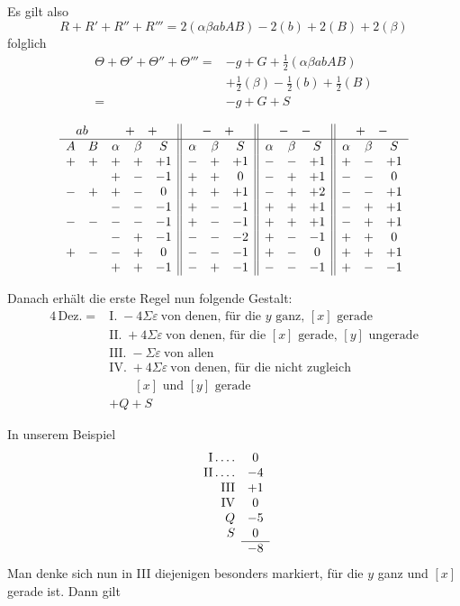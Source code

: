 Es gilt also
\[
R+R'+R''+R'''=2(\alpha\beta abAB)-2(b)+2(B)+2(\beta)
\]
folglich
\[
\begin{aligned}
\Theta+\Theta'+\Theta''+\Theta'''={}&-g+G+\tfrac12(\alpha\beta abAB)\\
&+\tfrac12(\beta)-\tfrac12(b)+\tfrac12(B)\\
={}&-g+G+S
\end{aligned}
\]

\begingroup\small\setlength{\arraycolsep}{2.6pt}
\[
\begin{array}{ccccc||ccc||ccc||ccc}
\multicolumn{2}{c}{ab}&\multicolumn{3}{c||}{+\quad+}&\multicolumn{3}{c||}{-\quad+}&\multicolumn{3}{c||}{-\quad-}&\multicolumn{3}{c}{+\quad-}\\\hline
A&B&\alpha&\beta&S&\alpha&\beta&S&\alpha&\beta&S&\alpha&\beta&S\\
+&+&+&+&+1&-&+&+1&-&-&+1&+&-&+1\\
&&+&-&-1&+&+&0&-&+&+1&-&-&0\\
-&+&+&-&0&+&+&+1&-&+&+2&-&-&+1\\
&&-&-&-1&+&-&-1&+&+&+1&-&+&+1\\
-&-&-&-&-1&+&-&-1&+&+&+1&-&+&+1\\
&&-&+&-1&-&-&-2&+&-&-1&+&+&0\\
+&-&-&+&0&-&-&-1&+&-&0&+&+&+1\\
&&+&+&-1&-&+&-1&-&-&-1&+&-&-1\\
\end{array}
\]
\endgroup

Danach erhält die erste Regel nun folgende Gestalt:
\[
\begin{aligned}
4\,\text{Dez.}={}&\text{I.}\;-4\Sigma\varepsilon\ \text{von denen, für die }y\text{ ganz, }[x]\text{ gerade}\\
&\text{II.}\;+4\Sigma\varepsilon\ \text{von denen, für die }[x]\text{ gerade, }[y]\text{ ungerade}\\
&\text{III.}\;-\Sigma\varepsilon\ \text{von allen}\\
&\text{IV.}\;+4\Sigma\varepsilon\ \text{von denen, für die nicht zugleich}\\
&\qquad [x]\text{ und }[y]\text{ gerade}\\
&+Q+S
\end{aligned}
\]

In unserem Beispiel
\[
\begin{array}{rc}
\mathrm{I}\dotsfour&0\\
\mathrm{II}\dotsfour&-4\\
\mathrm{III}&+1\\
\mathrm{IV}&0\\
Q&-5\\
S&0\\\cline{2-2}
&-8
\end{array}
\]
Man denke sich nun in III diejenigen besonders markiert, für die $y$ ganz und $[x]$ gerade ist. Dann gilt

